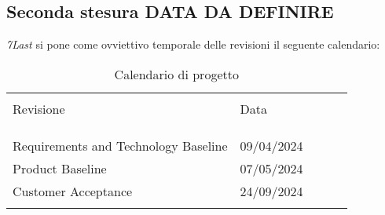 \subsection{Seconda stesura DATA DA DEFINIRE}
\textit{7Last} si pone come ovviettivo temporale delle revisioni il seguente calendario:
\begin{table}[!h]

    \begin{center}
        \begin{tabular}{ l l l l p{9cm} }
            \hline                                                                                                          \\[-2ex]
            Revisione & Data\\
            \\[-2ex] \hline \\[-1.5ex]                                                                                      \\
            Requirements and Technology Baseline & 09/04/2024 \\
            Product Baseline & 07/05/2024 \\
            Customer Acceptance & 24/09/2024 \\
            \\[-1.5ex] \hline
        \end{tabular}
    \end{center}
    \caption{Calendario di progetto}

\end{table}
